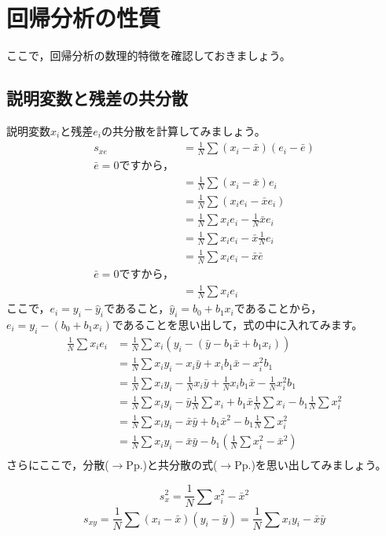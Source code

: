 \documentclass{ltjbook}
\begin{document}
\section{回帰分析の性質}\label{properties_of_lm}
ここで，回帰分析の数理的特徴を確認しておきましょう。

\subsection{説明変数と残差の共分散}
説明変数$x_i$と残差$e_i$の共分散を計算してみましょう。
\begin{align}
s_{xe} &= \frac{1}{N}\sum(x_i - \bar{x})(e_i - \bar{e}) \\
\text{$\bar{e}=0$ですから，}\\
&= \frac{1}{N}\sum(x_i - \bar{x})e_i \\
&= \frac{1}{N}\sum(x_ie_i - \bar{x}e_i) \\
&= \frac{1}{N}\sum x_ie_i - \frac{1}{N} \bar{x}e_i \\
&= \frac{1}{N}\sum x_ie_i - \bar{x}\frac{1}{N} e_i \\
&= \frac{1}{N}\sum x_ie_i - \bar{x} \bar{e} \\
\text{$\bar{e}=0$ですから，}\\
&= \frac{1}{N}\sum x_ie_i
\end{align}
ここで，$e_i = y_i - \hat{y}_i$であること，$\hat{y}_i = b_0 + b_1x_i$であることから，$e_i = y_i - (b_0 + b_1x_i)$であることを思い出して，式の中に入れてみます。
\begin{align}
	\frac{1}{N} \sum x_i e_i &=\frac{1}{N}\sum x_i(y_i - (\bar{y} - b_1\bar{x} + b_1x_i))\\
	&= \frac{1}{N} \sum x_iy_i - x_i\bar{y} + x_ib_1\bar{x} - x_i^2b_1\\
	&= \frac{1}{N} \sum x_iy_i - \frac{1}{N}x_i\bar{y} + \frac{1}{N}x_ib_1\bar{x} - \frac{1}{N}x_i^2b_1\\
	&= \frac{1}{N} \sum x_iy_i - \bar{y}\frac{1}{N}\sum x_i + b_1\bar{x}\frac{1}{N}\sum x_i - b_1\frac{1}{N}\sum x_i^2\\
	&= \frac{1}{N}\sum x_iy_i - \bar{x}\bar{y} + b_1\bar{x}^2 - b_1\frac{1}{N}\sum x_i^2\\
	&= \frac{1}{N}\sum x_iy_i - \bar{x}\bar{y} - b_1(\frac{1}{N}\sum x_i^2 -\bar{x}^2)\\
\end{align}
さらにここで，分散($\to$Pp.\pageref{ref:variance_form2})と共分散の式($\to$Pp.\pageref{ref:covariance})を思い出してみましょう。

\[ s_x^2 = \frac{1}{N}\sum x_i^2 - \bar{x}^2 \]
\[ s_{xy} = \frac{1}{N}\sum (x_i - \bar{x})(y_i - \bar{y}) = \frac{1}{N}\sum x_iy_i - \bar{x}\bar{y} \]
\end{document}

